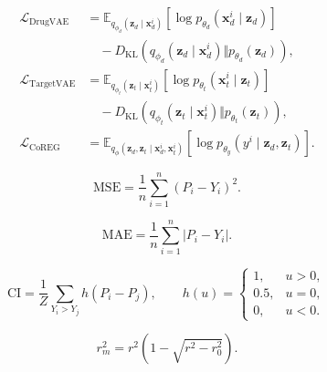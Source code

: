 \begin{equation}
\begin{aligned}
\mathcal{L}_{\mathrm{DrugVAE}}
&=\mathbb{E}_{q_{\phi_d}(\mathbf{z}_d\mid\mathbf{x}_d^i)}
[\log p_{\theta_d}(\mathbf{x}_d^i\mid\mathbf{z}_d)]\\
&\quad-D_{\mathrm{KL}}\!\left(
q_{\phi_d}(\mathbf{z}_d\mid\mathbf{x}_d^i)
\Vert p_{\theta_d}(\mathbf{z}_d)\right),\\
\mathcal{L}_{\mathrm{TargetVAE}}
&=\mathbb{E}_{q_{\phi_t}(\mathbf{z}_t\mid\mathbf{x}_t^i)}
[\log p_{\theta_t}(\mathbf{x}_t^i\mid\mathbf{z}_t)]\\
&\quad-D_{\mathrm{KL}}\!\left(
q_{\phi_t}(\mathbf{z}_t\mid\mathbf{x}_t^i)
\Vert p_{\theta_t}(\mathbf{z}_t)\right),\\
\mathcal{L}_{\mathrm{CoREG}}
&=\mathbb{E}_{q_\phi(\mathbf{z}_d,\mathbf{z}_t\mid
\mathbf{x}_d^i,\mathbf{x}_t^i)}
[\log p_{\theta_y}(y^i\mid\mathbf{z}_d,\mathbf{z}_t)].
\end{aligned}
\label{eq:covae-components}
\end{equation}

\begin{equation}
\mathrm{MSE}=\frac{1}{n}\sum_{i=1}^{n}(P_i-Y_i)^2.
\label{eq:mse}
\end{equation}

\begin{equation}
\mathrm{MAE}=\frac{1}{n}\sum_{i=1}^{n}|P_i-Y_i|.
\label{eq:mae}
\end{equation}

\begin{equation}
\mathrm{CI}=\frac{1}{Z}\sum_{Y_i>Y_j}h(P_i-P_j),
\qquad
h(u)=
\begin{cases}
1,&u>0,\\
0.5,&u=0,\\
0,&u<0.
\end{cases}
\label{eq:ci}
\end{equation}

\begin{equation}
r_m^2=r^2\left(1-\sqrt{r^2-r_0^2}\right).
\label{eq:rm2}
\end{equation}


